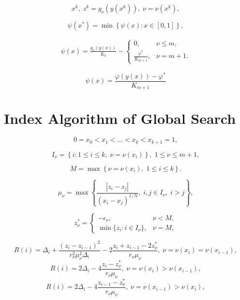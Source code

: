 \documentclass[review]{elsarticle}
\begin{document}
\begin{equation}\label{trial_result}
	x^k, \; z^k = g_{\nu}\left( y(x^k) \right), \; \nu = \nu(x^k),
\end{equation}

\begin{equation}\label{reduction_problem}
	\psi(x^*)=\min \left\{\psi(x): x \in [0,1] \right\},
\end{equation}

\begin{eqnarray}
	\psi(x)=\frac{g_{\nu}(y(x))}{K_{\nu}} - 
	\left\{
   \begin{array}{lr}
     0, & \nu \leq m,\\
     \frac{\varphi^*}{K_{m+1}}, & \nu = m + 1.
   \end{array}
	\right.
\end{eqnarray}

\[
	\psi(x)=\frac{\varphi(y(x))-\varphi^*}{K_{m+1}}
\]

\section{Index Algorithm of Global Search}

\[
	0=x_0<x_1<\dots <x_k<x_{k+1}=1,
\]

\[
	I_\nu =\left\{i:1 \leq i \leq k, \; \nu=\nu(x_i) \right\}, \; 1 \leq \nu \leq m+1,
\]

\[
	M=\max\left\{\nu=\nu(x_i), \; 1 \leq i \leq k \right \}.
\]

\begin{equation}\label{current_lower_bounds}
	\mu_{\nu} = \max\left\{ \frac{\left|z_i-z_j\right|}{ (x_i - x_j)^{1/N} }, \; i,j \in I_\nu, \; i>j \right\},
\end{equation}

\begin{equation}\label{z_estimates}
	z_\nu^\ast = \left\{
   \begin{array}{lr}
     -\epsilon_\nu, & \nu < M,\\
     \min\{ z_i: i\in I_\nu \}, & \nu = M,
   \end{array}
	\right.
\end{equation}

\begin{equation}\label{R_1}
	R(i)=\Delta_i+\frac{(z_i-z_{i-1})^2}{r_\nu^2 \mu_\nu^2\Delta_i}-2\frac{z_i+z_{i-1}-2z_\nu^\ast}{r_\nu \mu_\nu}, \;  \nu=\nu(x_i)=\nu(x_{i-1}),
\end{equation}
\begin{equation}\label{R_2}
	R(i)=2\Delta_i-4\frac{z_i-z_\nu^\ast}{r_\nu \mu_\nu}, \; \nu=\nu(x_i)>\nu(x_{i-1}),
\end{equation}
\begin{equation}\label{R_3}
R(i)=2\Delta_i-4\frac{z_{i-1}-z_\nu^\ast}{r_\nu \mu_\nu}, \; \nu=\nu(x_{i-1})>\nu(x_i),
\end{equation}
\end{document}
